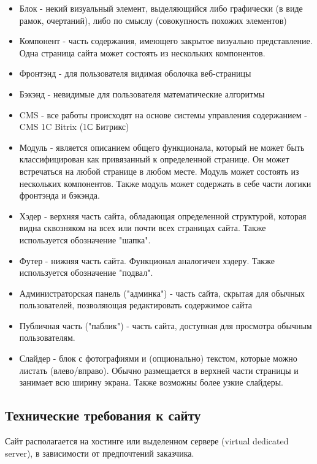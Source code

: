 \documentclass[DIV=calc, paper=a4, fontsize=11pt]{scrartcl} %
\begin{document}
        \begin{itemize}
        \item Блок - некий визуальный элемент, выделяющийся либо графически (в виде рамок, очертаний), либо по смыслу (совокупность похожих элементов)
        \item Компонент - часть содержания, имеющего закрытое визуально представление. Одна страница сайта может состоять из нескольких компонентов.
        \item Фронтэнд - для пользователя видимая оболочка веб-страницы
        \item Бэкэнд - невидимые для пользователя математические алгоритмы
        \item CMS - все работы происходят на основе системы управления содержанием - CMS 1C Bitrix (1С Битрикс)
        \item Модуль - является описанием общего функционала, который не может быть классифицирован как привязанный к определенной странице. Он может встречаться на любой странице в любом месте. Модуль может состоять из нескольких компонентов. Также модуль может содержать в себе части логики фронтэнда и бэкэнда.
        \item Хэдер - верхняя часть сайта, обладающая определенной структурой, которая видна сквозняком на всех или почти всех страницах сайта. Также используется обозначение "шапка".
        \item Футер - нижняя часть сайта. Функционал аналогичен хэдеру. Также используется обозначение "подвал".
        \item Администраторская панель ("админка") - часть сайта, скрытая для обычных пользователей, позволяющая редактировать содержимое сайта
        \item Публичная часть ("паблик") - часть сайта, доступная для просмотра обычным пользователям.
        \item Слайдер - блок с фотографиями и (опционально) текстом, которые можно листать (влево/вправо). Обычно размещается в верхней части страницы и занимает всю ширину экрана. Также возможны более узкие слайдеры.

    \end{itemize}
    
\subsection{Технические требования к сайту}
Сайт располагается на хостинге или выделенном сервере (virtual dedicated server), в зависимости от предпочтений заказчика.
\end{document}
